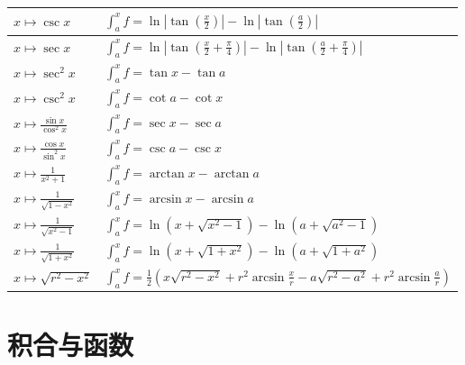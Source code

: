 \documentclass[12pt,UTF8]{ctexbook}
\theoremstyle{definition}
\theoremstyle{plain}
\begin{document}
\begin{appendix}
\begin{center}
\begin{longtable}{|l|l|}
        \hline    
        $\displaystyle x\mapsto \csc{x}$ & $\displaystyle \int_a^x f = \ln{\left|\tan{\left(\frac{x}{2}\right)}\right|} - \ln{\left|\tan{\left(\frac{a}{2}\right)}\right|}$ \\[4pt]
        \hline    
        $\displaystyle x\mapsto \sec{x}$ & $\displaystyle \int_a^x f = \ln{\left|\tan{\left(\frac{x}{2} + \frac{\pi}{4}\right)}\right|} - \ln{\left|\tan{\left(\frac{a}{2} + \frac{\pi}{4}\right)}\right|}$ \\[4pt]
        \hline    
        $\displaystyle x\mapsto \sec^2{x}$ & $\displaystyle \int_a^x f = \tan{x} - \tan{a}$ \\[4pt]
        \hline    
        $\displaystyle x\mapsto \csc^2{x}$ & $\displaystyle \int_a^x f = \cot{a} - \cot{x}$ \\[4pt]
        \hline    
        $\displaystyle x\mapsto \frac{\sin{x}}{\cos^2{x}}$ & $\displaystyle \int_a^x f = \sec{x} - \sec{a}$ \\[4pt]
        \hline    
        $\displaystyle x\mapsto \frac{\cos{x}}{\sin^2{x}}$ & $\displaystyle \int_a^x f = \csc{a} - \csc{x}$ \\[4pt]
        \hline    
        $\displaystyle x\mapsto \frac{1}{x^2 + 1}$ & $\displaystyle \int_a^x f = \arctan{x} - \arctan{a}$ \\[4pt]
        \hline    
        $\displaystyle x\mapsto \frac{1}{\sqrt{1 - x^2}}$ & $\displaystyle \int_a^x f = \arcsin{x} - \arcsin{a}$ \\[4pt]
        \hline    
        $\displaystyle x\mapsto \frac{1}{\sqrt{x^2 - 1}}$ & $\displaystyle \int_a^x f = \ln{\left(x + \sqrt{x^2 - 1}\right)} - \ln{\left(a + \sqrt{a^2 - 1}\right)}$ \\[4pt]
        \hline    
        $\displaystyle x\mapsto \frac{1}{\sqrt{1 + x^2}}$ & $\displaystyle \int_a^x f = \ln{\left(x + \sqrt{1 + x^2}\right)} - \ln{\left(a + \sqrt{1 + a^2}\right)}$ \\[4pt]
        \hline    
        $\displaystyle x\mapsto \sqrt{r^2 - x^2}$ & $\displaystyle \int_a^x f = \frac{1}{2}\left(x\sqrt{r^2 - x^2} + r^2\arcsin{\frac{x}{r}} - a\sqrt{r^2 - a^2} + r^2\arcsin{\frac{a}{r}}\right)$ \\[4pt]
        \hline
    \end{longtable}
\end{center}

\section{积合与函数}


\end{appendix}
\end{document}
